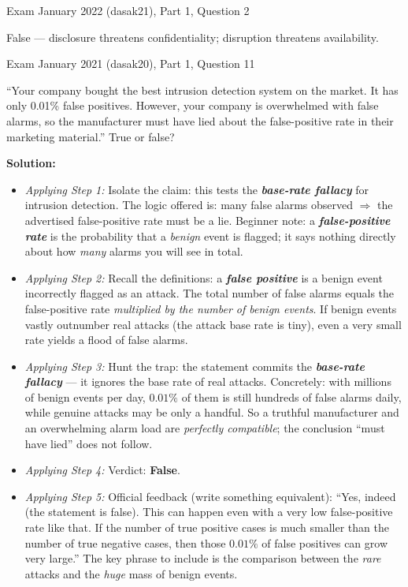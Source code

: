 \documentclass[12pt, a4paper]{article}
\newcommand{\term}[1]{\textbf{\textit{#1}}}        %
\begin{document}
\begin{practicebox}{Exam January 2022 (dasak21), Part 1, Question 2}
\begin{answerbox}
False --- disclosure threatens confidentiality; disruption threatens availability.
\end{answerbox}
\end{practicebox}

\begin{practicebox}{Exam January 2021 (dasak20), Part 1, Question 11}
\begin{problembox}
``Your company bought the best intrusion detection system on the market. It has only 0.01\% false positives. However, your company is overwhelmed with false alarms, so the manufacturer must have lied about the false-positive rate in their marketing material.'' True or false?
\end{problembox}

\textbf{Solution:}
\begin{itemize}
    \item \textit{Applying Step 1:} Isolate the claim: this tests the \term{base-rate fallacy} for intrusion detection. The logic offered is: many false alarms observed $\Rightarrow$ the advertised false-positive rate must be a lie.
    Beginner note: a \term{false-positive rate} is the probability that a \emph{benign} event is flagged; it says nothing directly about how \emph{many} alarms you will see in total.
    \item \textit{Applying Step 2:} Recall the definitions: a \term{false positive} is a benign event incorrectly flagged as an attack. The total number of false alarms equals the false-positive rate \emph{multiplied by the number of benign events}.
    If benign events vastly outnumber real attacks (the attack base rate is tiny), even a very small rate yields a flood of false alarms.
    \item \textit{Applying Step 3:} Hunt the trap: the statement commits the \term{base-rate fallacy} --- it ignores the base rate of real attacks. Concretely: with millions of benign events per day, $0.01\%$ of them is still hundreds of false alarms daily, while genuine attacks may be only a handful.
    So a truthful manufacturer and an overwhelming alarm load are \emph{perfectly compatible}; the conclusion ``must have lied'' does not follow.
    \item \textit{Applying Step 4:} Verdict: \textbf{False}.
    \item \textit{Applying Step 5:} Official feedback (write something equivalent): ``Yes, indeed (the statement is false). This can happen even with a very low false-positive rate like that.
    If the number of true positive cases is much smaller than the number of true negative cases, then those $0.01\%$ of false positives can grow very large.'' The key phrase to include is the comparison between the \emph{rare} attacks and the \emph{huge} mass of benign events.
\end{itemize}


\end{practicebox}
\end{document}
